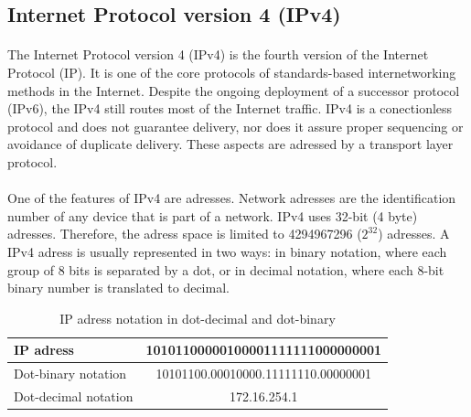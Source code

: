 \documentclass[12pt,a4paper]{report}
\begin{document}
\subsection{Internet Protocol version 4 (IPv4)}
\paragraph{}The Internet Protocol version 4 (IPv4) is the fourth version of the Internet Protocol (IP). It is one of the core protocols of standards-based internetworking methods in the Internet. Despite the ongoing deployment of a successor protocol (IPv6), the IPv4 still routes most of the Internet traffic. IPv4 is a conectionless protocol and does not guarantee delivery, nor does it assure proper sequencing or avoidance of duplicate delivery. These aspects are adressed by a transport layer protocol.
\paragraph{}One of the features of IPv4 are adresses. Network adresses are the identification number of any device that is part of a network. IPv4 uses 32-bit (4 byte) adresses. Therefore, the adress space is limited to 4294967296 ($2^{32}$) adresses. A IPv4 adress is usually represented in two ways: in binary notation, where each group of 8 bits is separated by a dot, or in decimal notation, where each 8-bit binary number is translated to decimal.
\begin{table}[H]
\begin{center}
\begin{tabular}{|l|c|}
\hline 
IP adress & 10101100000100001111111000000001 \\ 
\hline 
Dot-binary notation & 10101100.00010000.11111110.00000001 \\ 
\hline 
Dot-decimal notation & 172.16.254.1 \\ 
\hline 
\end{tabular}
\end{center}
\caption[IP adress notation]{IP adress notation in dot-decimal and dot-binary}
\end{table}
\end{document}
